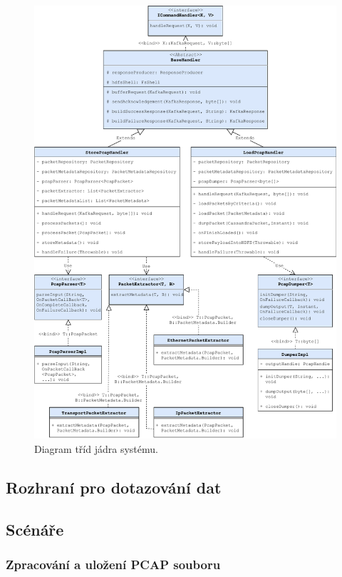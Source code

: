 \begin{figure}[!h]
  \centering
  \includegraphics[width=15cm]{template-fig/DRCoreClassDiagram.pdf}
  \caption{Diagram tříd jádra systému.}
  \label{FIG_DRCoreClassDiagram}
\end{figure}

\subsection{Rozhraní pro dotazování dat}

\subsection{Scénáře}

\subsubsection{Zpracování a uložení PCAP souboru}

